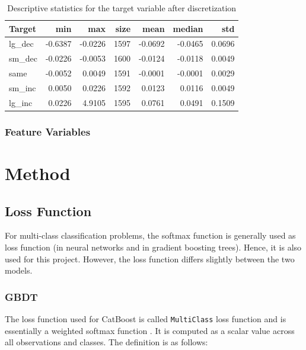 \documentclass{article}
\begin{document}
	
	\begin{table}[h!]
	\centering
	\caption{Descriptive statistics for the target variable after discretization}
	\label{table:desc_target_disc}
		\begin{tabular}{lrrrrrr}
			\toprule
			{}Target &     min &     max &  size &    mean &  median &     std \\
			\midrule
			lg\_dec & -0.6387 & -0.0226 &  1597 & -0.0692 & -0.0465 &  0.0696 \\
			sm\_dec & -0.0226 & -0.0053 &  1600 & -0.0124 & -0.0118 &  0.0049 \\
			same   & -0.0052 &  0.0049 &  1591 & -0.0001 & -0.0001 &  0.0029 \\
			sm\_inc &  0.0050 &  0.0226 &  1592 &  0.0123 &  0.0116 &  0.0049 \\
			lg\_inc &  0.0226 &  4.9105 &  1595 &  0.0761 &  0.0491 &  0.1509 \\
			\bottomrule
		\end{tabular}

	\end{table}%

	
	
	
	\subsubsection{Feature Variables}
	

	\section{Method}
	
	\subsection{Loss Function}
	
	For multi-class classification problems, the softmax function is generally used as loss function (in neural networks and in gradient boosting trees). Hence, it is also used for this project. However, the loss function differs slightly between the two models.
	
	\subsubsection{GBDT}
	
	The loss function used for CatBoost is called \lstinline{MultiClass} loss function and is essentially a weighted softmax function \cite{noauthor_multiclassification:_nodate}. It is computed as a scalar value across all observations and classes. The definition is as follows:
	
\end{document}
